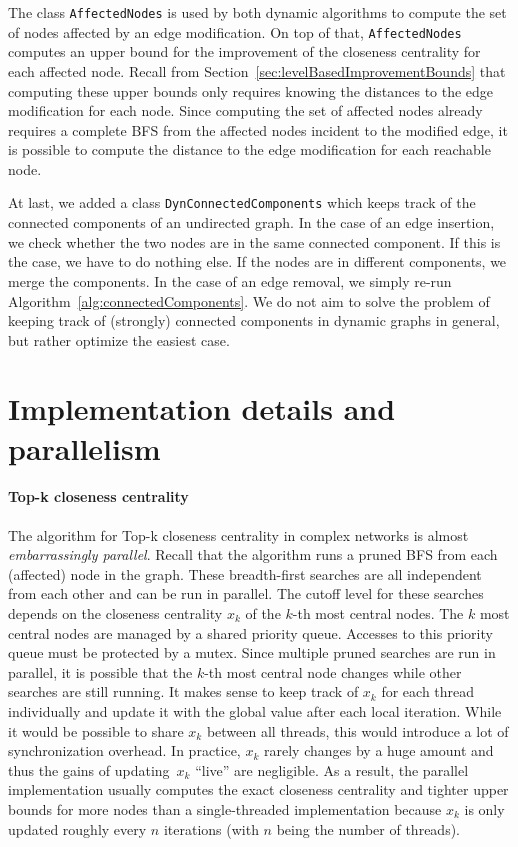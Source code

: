 The class \texttt{AffectedNodes} is used by both dynamic algorithms to compute the set of nodes affected by an edge modification. On top of that, \texttt{AffectedNodes} computes an upper bound for the improvement of the closeness centrality for each affected node. Recall from Section~\ref{sec:levelBasedImprovementBounds} that computing these upper bounds only requires knowing the distances to the edge modification for each node. Since computing the set of affected nodes already requires a complete BFS from the affected nodes incident to the modified edge, it is possible to compute the distance to the edge modification for each reachable node.

At last, we added a class \texttt{DynConnectedComponents} which keeps track of the connected components of an undirected graph. In the case of an edge insertion, we check whether the two nodes are in the same connected component. If this is the case, we have to do nothing else. If the nodes are in different components, we merge the components. In the case of an edge removal, we simply re-run Algorithm~\ref{alg:connectedComponents}. We do not aim to solve the problem of keeping track of (strongly) connected components in dynamic graphs in general, but rather optimize the easiest case.

\section{Implementation details and parallelism}
\paragraph{Top-k closeness centrality}
The algorithm for Top-k closeness centrality in complex networks is almost \emph{embarrassingly parallel}. Recall that the algorithm runs a pruned BFS from each (affected) node in the graph. These breadth-first searches are all independent from each other and can be run in parallel. The cutoff level for these searches depends on the closeness centrality $x_k$ of the $k$-th most central nodes. The $k$ most central nodes are managed by a shared priority queue. Accesses to this priority queue must be protected by a mutex. Since multiple pruned searches are run in parallel, it is possible that the $k$-th most central node changes while other searches are still running. It makes sense to keep track of $x_k$ for each thread individually and update it with the global value after each local iteration. While it would be possible to share $x_k$ between all threads, this would introduce a lot of synchronization overhead. In practice, $x_k$ rarely changes by a huge amount and thus the gains of updating~$x_k$ ``live'' are negligible. As a result, the parallel implementation usually computes the exact closeness centrality and tighter upper bounds for more nodes than a single-threaded implementation because $x_k$ is only updated roughly every $n$ iterations (with $n$ being the number of threads).

